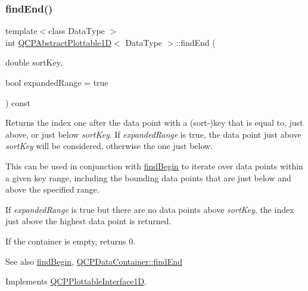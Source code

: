 \subsubsection{\texorpdfstring{find\+End()}{findEnd()}}
{\footnotesize\ttfamily template$<$class Data\+Type $>$ \\
int \hyperlink{classQCPAbstractPlottable1D}{Q\+C\+P\+Abstract\+Plottable1D}$<$ Data\+Type $>$\+::find\+End (\begin{DoxyParamCaption}\item[{double}]{sort\+Key,  }\item[{bool}]{expanded\+Range = {\ttfamily true} }\end{DoxyParamCaption}) const\hspace{0.3cm}{\ttfamily [virtual]}}





Returns the index one after the data point with a (sort-\/)key that is equal to, just above, or just below {\itshape sort\+Key}. If {\itshape expanded\+Range} is true, the data point just above {\itshape sort\+Key} will be considered, otherwise the one just below.

This can be used in conjunction with \hyperlink{classQCPAbstractPlottable1D_ad0b46d25cde3d035b180fb8f10c056e6}{find\+Begin} to iterate over data points within a given key range, including the bounding data points that are just below and above the specified range.

If {\itshape expanded\+Range} is true but there are no data points above {\itshape sort\+Key}, the index just above the highest data point is returned.

If the container is empty, returns 0.

\begin{DoxySeeAlso}{See also}
\hyperlink{classQCPAbstractPlottable1D_ad0b46d25cde3d035b180fb8f10c056e6}{find\+Begin}, \hyperlink{classQCPDataContainer_afb8b8f23cc2b7234a793a25ce79fe48f}{Q\+C\+P\+Data\+Container\+::find\+End} 
\end{DoxySeeAlso}


Implements \hyperlink{classQCPPlottableInterface1D_a5deced1016bc55a41a2339619045b295}{Q\+C\+P\+Plottable\+Interface1D}.

\mbox{\label{classQCPAbstractPlottable1D_ae890e62ce403c54f575c73b9529f1af8}} 

